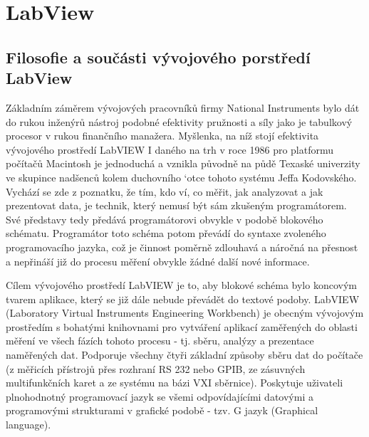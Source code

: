 \setchaptertoc
\chapter{LabView}\label{ES:kap_labview}


  \section{Filosofie a součásti vývojového porstředí LabView }
    Základním záměrem vývojových pracovníků firmy National Instruments bylo dát do rukou inženýrů
    nástroj podobné efektivity pružnosti a síly jako je tabulkový procesor v rukou finančního
    manažera. Myšlenka, na níž stojí efektivita vývojového prostředí LabVIEW I daného na trh v roce
    1986 pro platformu počítačů Macintosh je jednoduchá a vznikla původně na půdě Texaské univerzity
    ve skupince nadšenců kolem duchovního `otce tohoto systému Jeffa Kodovského. Vychází se zde z 
    poznatku, že tím, kdo ví, co měřit, jak analyzovat a jak prezentovat data, je technik, který
    nemusí být sám zkušeným programátorem. Své představy tedy předává programátorovi obvykle v
    podobě blokového schématu. Programátor toto schéma potom převádí do syntaxe zvoleného
    programovacího jazyka, což je činnost poměrně zdlouhavá a náročná na přesnost a nepřináší již do
    procesu měření obvykle žádné další nové informace.
     

    Cílem vývojového prostředí LabVIEW je to, aby blokové schéma bylo koncovým tvarem aplikace,
    který se již dále nebude převádět do textové podoby. LabVIEW (Laboratory Virtual Instruments
    Engineering Workbench) je obecným vývojovým prostředím s bohatými knihovnami pro vytváření
    aplikací zaměřených do oblasti měření ve všech fázích tohoto procesu - tj. sběru, analýzy a
    prezentace naměřených dat. Podporuje všechny čtyři základní způsoby sběru dat do počítače (z
    měřicích přístrojů přes rozhraní RS 232 nebo GPIB, ze zásuvných multifunkčních karet a ze
    systému na bázi VXI sběrnice). Poskytuje uživateli plnohodnotný programovací jazyk se všemi
    odpovídajícími datovými a programovými strukturami v grafické podobě - tzv. G jazyk (Graphical
    language)\cite[p.~21]{Zidek2002}.

